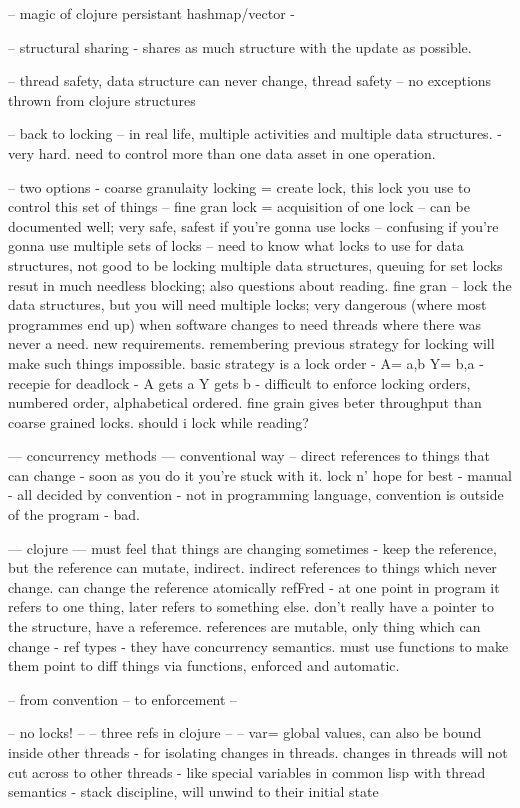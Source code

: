 \documentclass[12pt,a4paper]{article}
\begin{document}
-- magic of clojure persistant hashmap/vector -

-- structural sharing - shares as much structure with the update as possible. 

-- thread safety, data structure can never change, thread safety -- no exceptions thrown from clojure structures


-- back to locking --
in real life, multiple activities and multiple data structures. - very hard. need to control more than one data asset in one operation.

-- two options - coarse granulaity locking = create lock, this lock you use to control this set of things
-- fine gran lock = acquisition of one lock -- can be documented well; very safe, safest if you're gonna use locks -- confusing if you're gonna use multiple sets of locks -- need to know what locks to use for data structures, not good to be locking multiple data structures, queuing for set locks resut in much needless blocking; also questions about reading. fine gran -- lock the data structures, but you will need multiple locks; very dangerous (where most programmes end up) when software changes to need threads where there was never a need. new requirements. remembering previous strategy for locking will make such things impossible. basic strategy is a lock order - A= a,b Y= b,a - recepie for deadlock - A gets a Y gets b - difficult to enforce locking orders, numbered order, alphabetical ordered. fine grain gives beter throughput than coarse grained locks. should i lock while reading?

--- concurrency methods ---
conventional way -- direct references to things that can change - soon as you do it you're stuck with it. lock n' hope for best - manual - all decided by convention - not in programming language, convention is outside of the program - bad.


--- clojure ---
must feel that things are changing sometimes - keep the reference, but the reference can mutate, indirect. indirect references to things which never change. can change the reference atomically refFred - at one point in program it refers to one thing, later refers to something else. don't really have a pointer to the structure, have a referemce. references are mutable, only thing which can change - ref types - they have concurrency semantics. must use functions to make them point to diff things via functions, enforced and automatic. 

-- from convention -- to enforcement --

-- no locks! --
-- three refs in clojure --
-- var= global values, can also be bound inside other threads - for isolating changes in threads. changes in threads will not cut across to other threads - like special variables in common lisp with thread semantics - stack discipline, will unwind to their initial state
\end{document}
